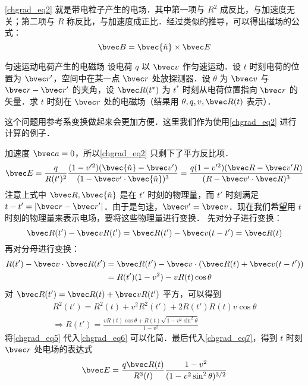 \autoref{chgrad_eq2}  就是带电粒子产生的电场．其中第一项与 $R^2$ 成反比，与加速度无关；第二项与 $R$ 称反比，与加速度成正比．经过类似的推导，可以得出磁场的公式：
\begin{equation}
\bvec B=\bvec{\hat n} \times \bvec E
\end{equation}
\begin{example}{匀速运动电荷产生的电磁场}
设电荷 $q$ 以 $\bvec v$ 作匀速运动．设 $t$ 时刻电荷的位置为 $\bvec r'$，空间中在某一点 $\bvec r$ 处放探测器．设 $\theta$ 为 $\bvec v$ 与 $\bvec r-\bvec r'$ 的夹角，设 $\bvec R(t^*)$ 为 $t^*$ 时刻从电荷位置指向 $\bvec r$ 的矢量．求 $t$ 时刻在 $\bvec r$ 处的电磁场（结果用 $\theta,q,v,\bvec R(t)$ 表示）．

这个问题用参考系变换做起来会更加方便．这里我们作为使用\autoref{chgrad_eq2} 进行计算的例子．

加速度 $\bvec a=0$，所以\autoref{chgrad_eq2} 只剩下了平方反比项．
\begin{equation}\label{chgrad_eq7}
\bvec E=\frac{q}{R(t')^2}\frac{(1-v'^2)(\bvec{\hat n}-\bvec v')}{(1-\bvec v'\cdot \bvec{\hat n})^3}=\frac{q(1-v'^2)(\bvec R-\bvec v'R)}{(R-\bvec v'\cdot \bvec R)^3}
\end{equation}
注意上式中 $\bvec R,\bvec{\hat n}$ 是在 $t'$ 时刻的物理量，而 $t'$ 时刻满足 $t-t'=|\bvec r-\bvec r'|$．由于是匀速，$\bvec v'=\bvec v$．现在我们希望用 $t$ 时刻的物理量来表示电场，要将这些物理量进行变换．
先对分子进行变换：
\begin{equation}\label{chgrad_eq4}
\bvec R(t')-\bvec vR(t')=\bvec R(t')-\bvec v(t-t')=\bvec R(t)
\end{equation}
再对分母进行变换：
\begin{equation}\label{chgrad_eq6}
\begin{aligned}
R(t')-\bvec v\cdot \bvec R(t')&=\bvec R(t')-\bvec v\cdot(\bvec R(t)+\bvec v(t-t'))\\
&=R(t')(1-v^2)- v R(t)\cos\theta
\end{aligned}
\end{equation}
对 $\bvec R(t')=\bvec R(t)+\bvec vR(t')$ 平方，可以得到
\begin{equation}\label{chgrad_eq5}
\begin{aligned}
R^2(t')=R^2(t)+v^2R^2(t')+2R(t')R(t)v\cos \theta\\
\Rightarrow R(t')=\frac{vR(t)\cos \theta+R(t)\sqrt{1-v^2\sin^2\theta}}{1-v^2}
\end{aligned}
\end{equation}
将\autoref{chgrad_eq5} 代入\autoref{chgrad_eq6}  可以化简．最后代入\autoref{chgrad_eq7}，得到 $t$ 时刻 $\bvec r$ 处电场的表达式
\begin{equation}
\bvec E=\frac{q\bvec R(t)}{R^3(t)}\frac{1-v^2}{(1-v^2\sin^2\theta)^{3/2}}
\end{equation}
\end{example}

